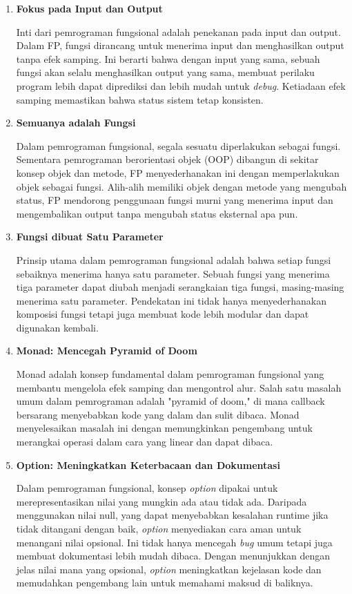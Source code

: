 \documentclass{article}
\begin{document}
\begin{enumerate}
    \item \textbf{Fokus pada Input dan Output}

    Inti dari pemrograman fungsional adalah penekanan pada input dan output. 
    Dalam FP, fungsi dirancang untuk menerima input dan menghasilkan 
    output tanpa efek samping. Ini berarti bahwa dengan input yang 
    sama, sebuah fungsi akan selalu menghasilkan output yang sama, membuat 
    perilaku program lebih dapat diprediksi dan lebih mudah untuk \textit{debug}. 
    Ketiadaan efek samping memastikan bahwa status sistem tetap konsisten.
    \item \textbf{Semuanya adalah Fungsi}

    Dalam pemrograman fungsional, segala sesuatu diperlakukan sebagai fungsi. 
    Sementara pemrograman berorientasi objek (OOP) dibangun di sekitar konsep 
    objek dan metode, FP menyederhanakan ini dengan memperlakukan objek 
    sebagai fungsi. Alih-alih memiliki objek dengan metode yang mengubah 
    status, FP mendorong penggunaan fungsi murni yang menerima input dan 
    mengembalikan output tanpa mengubah status eksternal apa pun.

    \item \textbf{Fungsi dibuat Satu Parameter}

    Prinsip utama dalam pemrograman fungsional adalah bahwa setiap fungsi 
    sebaiknya menerima hanya satu parameter. Sebuah fungsi yang 
    menerima tiga parameter dapat diubah menjadi serangkaian tiga fungsi, 
    masing-masing menerima satu parameter. Pendekatan ini tidak hanya 
    menyederhanakan komposisi fungsi tetapi juga membuat kode lebih modular 
    dan dapat digunakan kembali.

    \item \textbf{Monad: Mencegah Pyramid of Doom}

    Monad adalah konsep fundamental dalam pemrograman fungsional yang 
    membantu mengelola efek samping dan mengontrol alur. Salah satu masalah 
    umum dalam pemrograman adalah "pyramid of doom," di mana callback 
    bersarang menyebabkan kode yang dalam dan sulit dibaca. Monad 
    menyelesaikan masalah ini dengan memungkinkan pengembang untuk merangkai 
    operasi dalam cara yang linear dan dapat dibaca.

    \item \textbf{Option: Meningkatkan Keterbacaan dan Dokumentasi}

    Dalam pemrograman fungsional, konsep \textit{option} dipakai
    untuk merepresentasikan nilai yang mungkin ada atau tidak ada. Daripada 
    menggunakan nilai null, yang dapat menyebabkan kesalahan runtime jika 
    tidak ditangani dengan baik, \textit{option} menyediakan cara aman untuk 
    menangani nilai opsional. Ini tidak hanya mencegah \textit{bug} umum 
    tetapi juga membuat dokumentasi lebih mudah dibaca. Dengan menunjukkan 
    dengan jelas nilai mana yang opsional, \textit{option} meningkatkan 
    kejelasan kode dan memudahkan pengembang lain untuk memahami maksud di 
    baliknya.


\end{enumerate}
\end{document}
